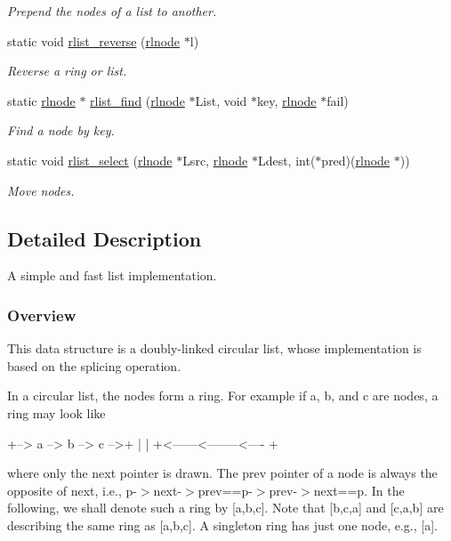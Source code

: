 \begin{DoxyCompactItemize}
\begin{DoxyCompactList}\small\item\em Prepend the nodes of a list to another. \end{DoxyCompactList}\item 
static void \hyperlink{group__rlists_ga3911836f21f2f50b4caa2fa1d8e1f1de}{rlist\+\_\+reverse} (\hyperlink{group__rlists_ga8f6244877f7ce2322c90525217ea6e7a}{rlnode} $\ast$l)
\begin{DoxyCompactList}\small\item\em Reverse a ring or list. \end{DoxyCompactList}\item 
static \hyperlink{group__rlists_ga8f6244877f7ce2322c90525217ea6e7a}{rlnode} $\ast$ \hyperlink{group__rlists_gafbb3a5edeac9f1d43130528292c47cf6}{rlist\+\_\+find} (\hyperlink{group__rlists_ga8f6244877f7ce2322c90525217ea6e7a}{rlnode} $\ast$List, void $\ast$key, \hyperlink{group__rlists_ga8f6244877f7ce2322c90525217ea6e7a}{rlnode} $\ast$fail)
\begin{DoxyCompactList}\small\item\em Find a node by key. \end{DoxyCompactList}\item 
static void \hyperlink{group__rlists_ga6016cbc055d242a03d823ebfec422c2b}{rlist\+\_\+select} (\hyperlink{group__rlists_ga8f6244877f7ce2322c90525217ea6e7a}{rlnode} $\ast$Lsrc, \hyperlink{group__rlists_ga8f6244877f7ce2322c90525217ea6e7a}{rlnode} $\ast$Ldest, int($\ast$pred)(\hyperlink{group__rlists_ga8f6244877f7ce2322c90525217ea6e7a}{rlnode} $\ast$))
\begin{DoxyCompactList}\small\item\em Move nodes. \end{DoxyCompactList}\end{DoxyCompactItemize}


\subsection{Detailed Description}
A simple and fast list implementation. 

\subsubsection*{Overview }

This data structure is a doubly-\/linked circular list, whose implementation is based on the splicing operation.

In a circular list, the nodes form a ring. For example if a, b, and c are nodes, a ring may look like \begin{DoxyVerb}+--> a --> b --> c -->+
|                                |
+<------<--------<----  +
\end{DoxyVerb}
 where only the {\ttfamily next} pointer is drawn. The {\ttfamily prev} pointer of a node is always the opposite of {\ttfamily next}, i.\+e., {\ttfamily p-\/$>$next-\/$>$prev==p-\/$>$prev-\/$>$next==p}. In the following, we shall denote such a ring by \mbox{[}a,b,c\mbox{]}. Note that \mbox{[}b,c,a\mbox{]} and \mbox{[}c,a,b\mbox{]} are describing the same ring as \mbox{[}a,b,c\mbox{]}. A singleton ring has just one node, e.\+g., \mbox{[}a\mbox{]}.

